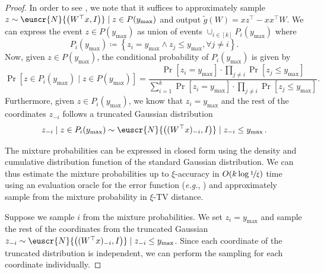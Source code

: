 \documentclass[11pt,letterpaper]{article}
\theoremstyle{plain}
\theoremstyle{definition}
\theoremstyle{remark}
\newcommand{\inbrace}[1]{\ensuremath{\left\{#1\right\}}}
\newcommand{\inparen}[1]{\ensuremath{\left(#1\right)}}
\newcommand{\insquare}[1]{\ensuremath{\left[#1\right]}}
\newcommand{\nfrac}[2]{\nicefrac{#1}{#2}}
\renewcommand{\tilde}{\widetilde}
\newcommand{\customcal}[1]{\euscr{#1}}
\newcommand{\cN}{\customcal{N}}
\newcommand{\eg}{\emph{e.g.}}
\newcommand{\normal}[2]{\cN{\inparen{#1,#2}}}
\newcommand{\ymax}{y_{\max}}
\begin{document}
{{\begin{proof}
        In order to see ,
        we note that it suffices to approximately sample \mbox{$z\sim \normal{W^\top x}{I}\mid z\in P(\ymax)$}
        and output $\tilde g(W) = xz^\top - xx^\top W$.
        We can express the event $z\in P(\ymax)$ as union of events $\cup_{i\in [k]} P_i(\ymax)$ where
        \[
            P_i(\ymax) \coloneqq \inbrace{z_i=\ymax\land z_j\leq \ymax, \forall j\neq i}.
        \]
        Now, given $z\in P(\ymax)$,
        the conditional probability of $P_i(\ymax)$ is given by
        \[
            \Pr\insquare{z\in P_i(\ymax)\mid z\in P(\ymax)}
            = \frac{\Pr[z_i=\ymax]\cdot \prod_{j\neq i} \Pr[z_j\leq \ymax]}{\sum_{i=1}^k \Pr[z_i=\ymax]\cdot \prod_{j\neq i} \Pr[z_j\leq \ymax]}.
        \]
        Furthermore,
        given $z\in P_i(\ymax)$,
        we know that $z_i = \ymax$ and the rest of the coordinates $z_{-i}$ follows a truncated Gaussian distribution
        \[
            z_{-i}\mid z\in P_i(\ymax) \sim \normal{(W^\top x)_{-i}}{I}\mid z_{-i}\leq \ymax\,.
        \]
        
        The mixture probabilities can be expressed in closed form using the density and cumulative distribution function of the standard Gaussian distribution.
        We can thus estimate the mixture probabilities up to $\xi$-accuracy in $O(k\log\nfrac1\xi)$ time using an evaluation oracle for the error function (\eg{}, \cite[Proposition 3]{chevillard2012erf})
        and approximately sample from the mixture probability in $\xi$-TV distance.
        
        Suppose we sample $i$ from the mixture probabilities.
        We set $z_i = \ymax$ and sample the rest of the coordinates from the truncated Gaussian $z_{-i}\sim \normal{(W^\top x)_{-i}}{I}\mid z_{-i}\leq \ymax$.
        Since each coordinate of the truncated distribution is independent,
        we can perform the sampling for each coordinate individually.


\end{proof}}}
\end{document}
